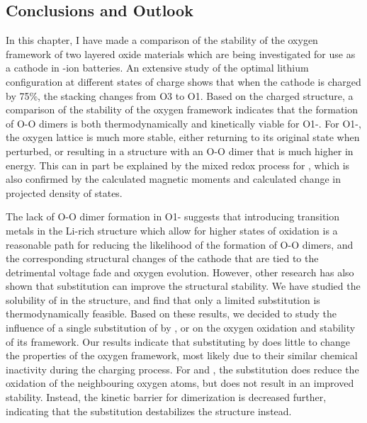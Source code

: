 \begin{refsection}
\section{Conclusions and Outlook} 

In this chapter, I have made a comparison of the stability of the oxygen 
framework of two layered oxide materials which are being investigated for use 
as a cathode in -ion batteries. An extensive study of the optimal 
lithium configuration at different states of charge shows that when the 
 cathode is charged by 75\%, the stacking changes from O3 to O1.
Based on the charged structure, a comparison of the stability of the oxygen 
framework indicates that the formation of O-O dimers is both thermodynamically 
and kinetically viable for O1-. For O1-, the 
oxygen lattice is much more stable, either returning to its original 
state when perturbed, or resulting in a structure with an O-O dimer that is 
much higher in energy. This can in part be explained by the mixed redox 
process for , which is also confirmed by the calculated magnetic 
moments and calculated change in projected density of states.

The lack of O-O dimer formation in O1- suggests that introducing 
transition metals in the Li-rich structure which allow for higher states of 
oxidation is a reasonable path for reducing the likelihood of the formation of 
O-O dimers, and the corresponding structural changes of the cathode that are 
tied to the detrimental voltage fade and oxygen evolution. However, other 
research has also shown that  substitution can improve the structural 
stability. We have studied the solubility of  in the 
 structure, and find that only a limited substitution 
is thermodynamically feasible. Based on these results, we decided to study 
the influence of a single substitution of  by ,  
or  on the oxygen oxidation and stability of its framework. Our results 
indicate that substituting  by  does little to change the 
properties of the oxygen framework, most likely due to their similar 
chemical inactivity during the charging process. For  and , the 
substitution does reduce the oxidation of the neighbouring oxygen atoms, 
but does not result in an improved stability. Instead, the kinetic barrier 
for dimerization is decreased further, indicating that the substitution 
destabilizes the structure instead. 


\end{refsection}
